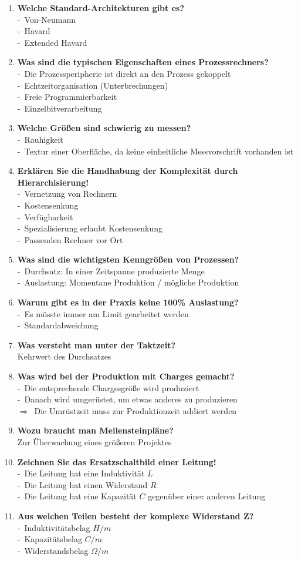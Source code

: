 \documentclass[a4paper,12pt]{article}
\newcommand{\questionnopage}[2]{\pagebreak[3]\item {\textbf{#1?}}#2}
\newcommand{\statementnopage}[2]{\pagebreak[3]\item {\textbf{#1!}}#2}
\newcommand{\catchword}[1]{\\-\ #1}
\newcommand{\normaltext}[1]{\\#1}
\newcommand{\result}[1]{\\$\Rightarrow$\ #1}
\begin{document}
\begin{enumerate}
  \questionnopage{Welche Standard-Architekturen gibt es}
  {
    \catchword{Von-Neumann}
    \catchword{Havard}
    \catchword{Extended Havard}
  }

  \questionnopage{Was sind die typischen Eigenschaften eines Prozessrechners}
  {
    \catchword{Die Prozessperipherie ist direkt an den Prozess gekoppelt}
    \catchword{Echtzeitorganisation (Unterbrechungen)}
    \catchword{Freie Programmierbarkeit}
    \catchword{Einzelbitverarbeitung}
  }

  \questionnopage{Welche Größen sind schwierig zu messen}
  {
    \catchword{Rauhigkeit}
    \catchword{Textur einer Oberfläche, da keine einheitliche Messvorschrift vorhanden ist}
  }

  \statementnopage{Erklären Sie die Handhabung der Komplexität durch Hierarchisierung}
  {
    \catchword{Vernetzung von Rechnern}
    \catchword{Kostensenkung}
    \catchword{Verfügbarkeit}
    \catchword{Spezialisierung erlaubt Kostensenkung}
    \catchword{Passenden Rechner vor Ort}
  }

  \questionnopage{Was sind die wichtigsten Kenngrößen von Prozessen}
  {
    \catchword{Durchsatz: In einer Zeitspanne produzierte Menge}
    \catchword{Auslastung: Momentane Produktion / mögliche Produktion}
  }

  \questionnopage{Warum gibt es in der Praxis keine 100\% Auslastung}
  {
    \catchword{Es müsste immer am Limit gearbeitet werden}
    \catchword{Standardabweichung}
  }

  \questionnopage{Was versteht man unter der Taktzeit}
  {
    \normaltext{Kehrwert des Durchsatzes}
  }

  \questionnopage{Was wird bei der Produktion mit Charges gemacht}
  {
    \catchword{Die entsprechende Chargesgröße wird produziert}
    \catchword{Danach wird umgerüstet, um etwas anderes zu produzieren}
    \result{Die Umrüstzeit muss zur Produktionzeit addiert werden}
  }

  \questionnopage{Wozu braucht man Meilensteinpläne}
  {
    \normaltext{Zur Überwachung eines größeren Projektes}
  }

  \statementnopage{Zeichnen Sie das Ersatzschaltbild einer Leitung}
  {
    \catchword{Die Leitung hat eine Induktivität $L$}
    \catchword{Die Leitung hat einen Widerstand $R$}
    \catchword{Die Leitung hat eine Kapazität $C$ gegenüber einer anderen Leitung}
  }

  \questionnopage{Aus welchen Teilen besteht der komplexe Widerstand Z}
  {
    \catchword{Induktivitätsbelag $H/m$}
    \catchword{Kapazitätsbelag $C/m$}
    \catchword{Widerstandsbelag $\Omega/m$}
  }


\end{enumerate}
\end{document}
